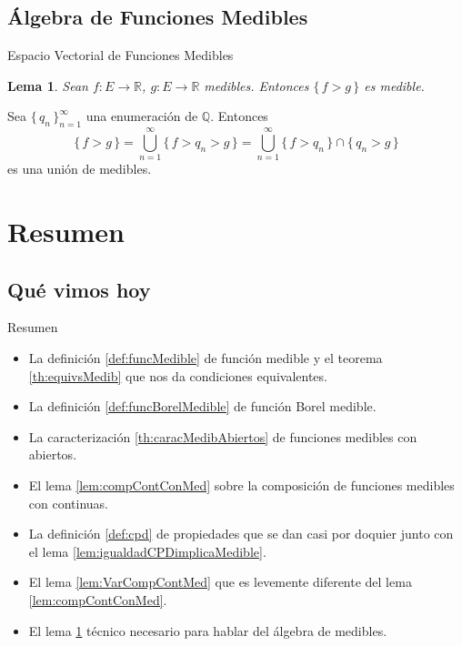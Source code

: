 \documentclass[utf8]{beamer}
\theoremstyle{plain}
\newtheorem{Lem}{Lema}                 %
\theoremstyle{definition}
\theoremstyle{remark}
\numberwithin{equation}{section}
\newcommand{\bQ}{\mathbb{Q}}    %
\newcommand{\bR}{\mathbb{R}}    %
\newcommand{\set}[1]{\{\,#1\,\}}    %
\newcommand{\sucn}{_{n=1}^\infty} %
\renewcommand{\.}{\Cdot}                %
\begin{document}
\subsection{Álgebra de Funciones Medibles}

\begin{frame}{Espacio Vectorial de Funciones Medibles}
  \begin{Lem}\label{lem:conjMedibEntreFuncs}
    Sean $f:E\to\bR$, $g:E\to\bR$ medibles. Entonces $\set{f>g}$ es medible.
  \end{Lem}
  Sea $\set{q_n}\sucn$ una enumeración de $\bQ$. Entonces 
  $$\set{f>g}=\bigcup\sucn\set{f>q_n>g}=\bigcup\sucn\set{f>q_n}\cap\set{q_n>g}$$
  es una unión de medibles.
\end{frame}

\section*{Resumen}

\subsection*{Qu\'e vimos hoy}

\begin{frame}{Resumen}

  \begin{itemize}
  \item La definición \ref{def:funcMedible} de función medible y el teorema \ref{th:equivsMedib} que nos da condiciones equivalentes.
  \item La definición \ref{def:funcBorelMedible} de función Borel medible.
  \item La caracterización \ref{th:caracMedibAbiertos} de funciones medibles con abiertos.
  \item El lema \ref{lem:compContConMed} sobre la composición de funciones medibles con continuas.
  \item La definición \ref{def:cpd} de propiedades que se dan casi por doquier junto con el lema \ref{lem:igualdadCPDimplicaMedible}.
  \item El lema \ref{lem:VarCompContMed} que es levemente diferente del lema \ref{lem:compContConMed}.
  \item El lema \ref{lem:conjMedibEntreFuncs} técnico necesario para hablar del álgebra de medibles.
  \end{itemize}
  
\end{frame}
\end{document}
